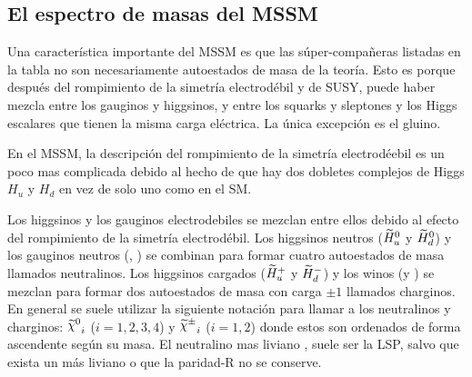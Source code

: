 \subsection{El espectro de masas del MSSM}

Una característica importante del MSSM es que las súper-compañeras listadas en la
tabla no son necesariamente autoestados de masa de la teoría. Esto es porque después
del rompimiento de la simetría electrodébil y de SUSY, puede haber mezcla entre
los gauginos y higgsinos, y entre los squarks y sleptones y los Higgs escalares
que tienen la misma carga eléctrica. La única excepción es el gluino.

En el MSSM, la descripción del rompimiento de la simetría electrodéebil es un
poco mas complicada debido al hecho de que hay dos dobletes complejos de Higgs
$H_u$ y $H_d$ en vez de solo uno como en el SM.







Los higgsinos y los gauginos electrodebiles se mezclan entre ellos debido al
efecto del rompimiento de la simetría electrodébil. Los higgsinos neutros
($\widetilde{H}_u^0$ y $\widetilde{H}_d^0$) y los gauginos neutros (\bino, \winozero)
se combinan para formar cuatro autoestados de masa llamados neutralinos.
Los higgsinos cargados ($\widetilde{H}_u^+$ y $\widetilde{H}_d^-$) y los winos
(\winop y \winom) se mezclan para formar dos autoestados de masa con carga
$\pm 1$ llamados charginos.
En general se suele utilizar la siguiente notación para llamar a los
neutralinos y charginos:
${\nino}_{i}$ ($i=1,2,3,4$) y ${\chinopm}_{i}$ ($i=1,2$) donde estos son
ordenados de forma ascendente según su masa. El neutralino mas liviano
{\ninoone}, suele ser la LSP, salvo que exista un {\gravino} más liviano
o que la paridad-R no se conserve.

